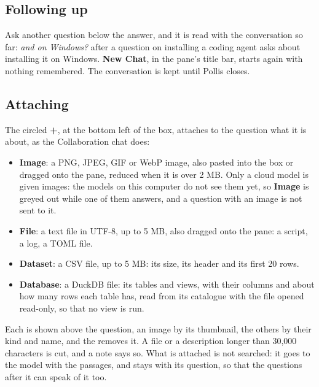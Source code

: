 \subsection{Following up}
Ask another question below the answer, and it is read with the conversation so far: \emph{and on Windows?} after a
question on installing a coding agent asks about installing it on Windows. \textbf{New Chat}, in the pane's title bar, starts again with
nothing remembered. The conversation is kept until Pollis closes.

\subsection{Attaching}
The circled \textbf{+}, at the bottom left of the box, attaches to the question what it is about, as the
Collaboration chat does:
\begin{itemize}
  \item \textbf{Image}: a PNG, JPEG, GIF or WebP image, also pasted into the box or dragged onto the pane, reduced
    when it is over 2 MB. Only a cloud model is given images: the models on this computer do not see them yet, so
    \textbf{Image} is greyed out while one of them answers, and a question with an image is not sent to it.
  \item \textbf{File}: a text file in UTF-8, up to 5 MB, also dragged onto the pane: a script, a log, a TOML file.
  \item \textbf{Dataset}: a CSV file, up to 5 MB: its size, its header and its first 20 rows.
  \item \textbf{Database}: a DuckDB file: its tables and views, with their columns and about how many rows each
    table has, read from its catalogue with the file opened read-only, so that no view is run.
\end{itemize}
Each is shown above the question, an image by its thumbnail, the others by their kind and name, and the \texttimes{}
removes it. A file or a description longer than 30,000 characters is cut, and a note says so. What is attached is not
searched: it goes to the model with the passages, and stays with its question, so that the questions after it can
speak of it too.

